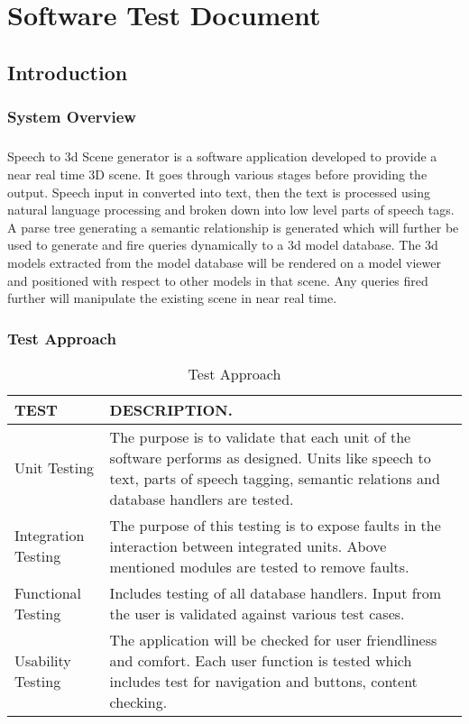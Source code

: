 \chapter{Software Test Document}
\section{Introduction}

\subsection{System Overview}
\paragraph{}Speech to 3d Scene generator is a software application developed to provide a near real time 3D scene. It goes through various stages before providing the output. Speech input in converted into text, then the text is processed using natural language processing and broken down into low level parts of speech tags.
	A parse tree generating a semantic relationship is generated which will further be used to generate and fire queries dynamically to a 3d model database. The 3d models extracted from the model database will be rendered on a model viewer and positioned with respect to other models in that scene. Any queries fired further will manipulate the existing scene in near real time.
\newpage
\subsection{Test Approach} 
\begin{table}[h!]
\caption{Test Approach}
  \centering
  \begin{tabular}{|p{3.5cm}|p{10cm}|}
\hline
   TEST& DESCRIPTION.\\
    \hline
    Unit Testing &The purpose is to validate that each unit of the software performs as designed. Units like speech to text, parts of speech tagging, semantic relations and database handlers are tested.\\
    \hline
    Integration Testing &The purpose of this testing is to expose faults in the interaction between integrated units. Above mentioned modules are tested to remove faults.\\

\hline
    Functional Testing  &Includes testing of all database handlers. Input from the user is validated against various test cases.\\
\hline
    Usability Testing &The application will be checked for user friendliness and comfort. Each user function is tested which includes test for navigation and buttons, content checking.\\
 \hline

  \end{tabular}
\end{table}

